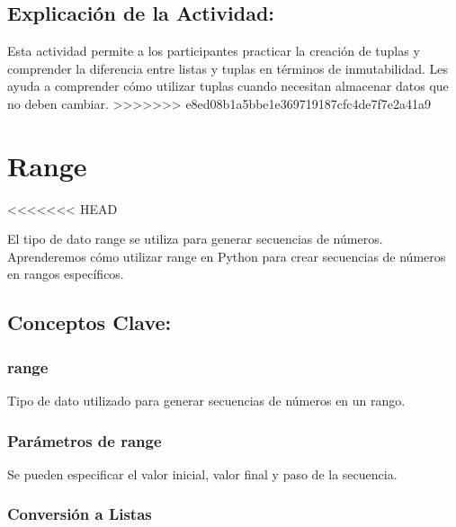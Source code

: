 \documentclass[
  a4paper,
  onepage,
  openany]{scrreprt}
\begin{document}
\hypertarget{explicaciuxf3n-de-la-actividad-19}{%
\section{Explicación de la
Actividad:}\label{explicaciuxf3n-de-la-actividad-19}}

Esta actividad permite a los participantes practicar la creación de
tuplas y comprender la diferencia entre listas y tuplas en términos de
inmutabilidad. Les ayuda a comprender cómo utilizar tuplas cuando
necesitan almacenar datos que no deben cambiar.
\textgreater\textgreater\textgreater\textgreater\textgreater\textgreater\textgreater{}
e8ed08b1a5bbe1e369719187cfc4de7f7e2a41a9

\hypertarget{range}{%
\chapter{Range}\label{range}}

\textless\textless\textless\textless\textless\textless\textless{} HEAD

El tipo de dato range se utiliza para generar secuencias de números.
Aprenderemos cómo utilizar range en Python para crear secuencias de
números en rangos específicos.

\hypertarget{conceptos-clave-22}{%
\section{Conceptos Clave:}\label{conceptos-clave-22}}

\hypertarget{range-1}{%
\subsection{range}\label{range-1}}

Tipo de dato utilizado para generar secuencias de números en un rango.

\hypertarget{paruxe1metros-de-range}{%
\subsection{Parámetros de range}\label{paruxe1metros-de-range}}

Se pueden especificar el valor inicial, valor final y paso de la
secuencia.

\hypertarget{conversiuxf3n-a-listas}{%
\subsection{Conversión a Listas}\label{conversiuxf3n-a-listas}}
\end{document}
